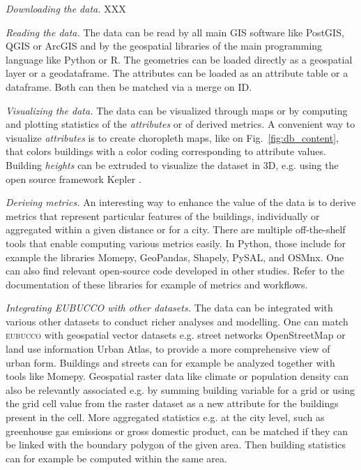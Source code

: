 \documentclass[fleqn,10pt]{wlscirep}
\begin{document}
\medskip \noindent \textit{Downloading the data.} \hspace{0.1cm}
XXX

\medskip \noindent \textit{Reading the data.} \hspace{0.1cm}
The data can be read by all main GIS software like PostGIS, QGIS or ArcGIS and by the geospatial libraries of the main programming language like Python or R. The geometries can be loaded directly as a geospatial layer or a geodataframe. The attributes can be loaded as an attribute table or a dataframe. Both can then be matched via a merge on ID. 

\medskip \noindent \textit{Visualizing the data.} \hspace{0.1cm} 
The data can be visualized through maps or by computing and plotting statistics of the \textit{attributes} or of derived metrics. A convenient way to visualize \textit{attributes} is to create choropleth maps, like on Fig.~\ref{fig:db_content}, that colors buildings with a color coding corresponding to attribute values. Building \textit{heights} can be extruded to visualize the dataset in 3D, e.g. using the open source framework Kepler \cite{kepler2021}. 

\medskip \noindent \textit{Deriving metrics.} \hspace{0.1cm} 
An interesting way to enhance the value of the data is to derive metrics that represent particular features of the buildings, individually or aggregated within a given distance or for a city. There are multiple off-the-shelf tools that enable computing various metrics easily. In Python, those include for example the libraries Momepy\cite{fleischmann2019momepy}, GeoPandas\cite{kelsey_jordahl_2020_3946761}, Shapely\cite{gillies_2021}, PySAL\cite{rey2010pysal}, and OSMnx\cite{boeing2017osmnx}. One can also find relevant open-source code developed in other studies\cite{2022_ceus_gbmi,milojevic2020learning}. Refer to the documentation of these libraries for example of metrics and workflows.

\medskip \noindent \textit{Integrating EUBUCCO with other datasets.} \hspace{0.1cm} 
The data can be integrated with various other datasets to conduct richer analyses and modelling. One can match \textsc{eubucco} with geospatial vector datasets e.g. street networks OpenStreetMap or land use information Urban Atlas, to provide a more comprehensive view of urban form. Buildings and streets can for example be analyzed together with tools like Momepy\cite{fleischmann2019momepy}. Geospatial raster data like climate or population density can also be relevantly associated e.g. by summing building variable for a grid or using the grid cell value from the raster dataset as a new attribute for the buildings present in the cell. More aggregated statistics e.g. at the city level, such as greenhouse gas emissions or gross domestic product, can be matched if they can be linked with the boundary polygon of the given area. Then building statistics can for example be computed within the same area.   
\end{document}
